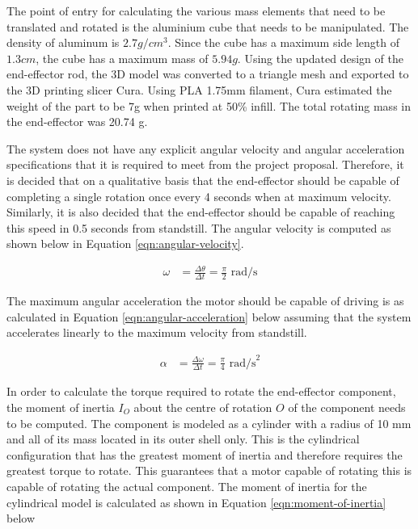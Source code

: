 
The point of entry for calculating the various mass elements that need to be translated and rotated is the aluminium cube that needs to be manipulated. The density of aluminum is $2.7 g/cm^3$. Since the cube has a maximum side length of $1.3 cm$, the cube has a maximum mass of $5.94 g$. Using the updated design of the end-effector rod, the 3D model was converted to a triangle mesh and exported to the 3D printing slicer Cura. Using PLA 1.75mm filament, Cura estimated the weight of the part to be 7g when printed at 50\% infill. The total rotating mass in the end-effector was 20.74 g.

The system does not have any explicit angular velocity and angular acceleration specifications that it is required to meet from the project proposal. Therefore, it is decided that on a qualitative basis that the end-effector should be capable of completing a single rotation once every 4 seconds when at maximum velocity. Similarly, it is also decided that the end-effector should be capable of reaching this speed in 0.5 seconds from standstill. The angular velocity is computed as shown below in Equation \ref{eqn:angular-velocity}.

\begin{align}
	\omega&=\frac{\Delta \theta}{\Delta t}=\frac{\pi}{2} \text{ rad/s}
	\label{eqn:angular-velocity}
\end{align}

The maximum angular acceleration the motor should be capable of driving is as calculated in Equation \ref{eqn:angular-acceleration} below assuming that the system accelerates linearly to the maximum velocity from standstill.

\begin{align}
	\alpha&=\frac{\Delta \omega}{\Delta t} =\frac{\pi}{4} \text{ rad/s}^2
	\label{eqn:angular-acceleration}
\end{align}

In order to calculate the torque required to rotate the end-effector component, the moment of inertia $I_O$ about the centre of rotation $O$ of the component needs to be computed. The component is modeled as a cylinder with a radius of 10 mm and all of its mass located in its outer shell only. This is the cylindrical configuration that has the greatest moment of inertia and therefore requires the greatest torque to rotate. This guarantees that a motor capable of rotating this is capable of rotating the actual component. The moment of inertia for the cylindrical model is calculated as shown in Equation \ref{eqn:moment-of-inertia} below

